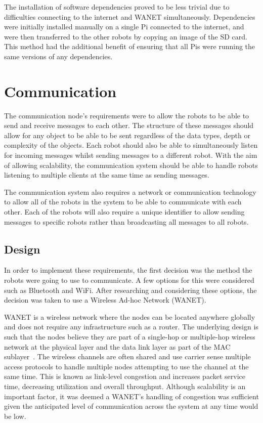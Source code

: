The installation of software dependencies proved to be less trivial due to
difficulties connecting to the internet and WANET simultaneously.
Dependencies were initially installed manually on a single Pi connected to
the internet, and were then transferred to the other robots by copying an
image of the SD card. This method had the additional benefit of ensuring
that all Pis were running the same versions of any dependencies.

\section{Communication}\label{soft/comms}
The communication node's requirements were to allow the robots to
be able to send and receive messages to each other. The structure
of these messages should allow for any object to be able to be sent
regardless of the data types, depth or complexity of the objects.
Each robot should also be able to simultaneously listen for
incoming messages whilst sending messages to a different robot.
With the aim of allowing scalability, the communication system
should be able to handle robots listening to multiple clients at the
same time as sending messages.

The communication system also requires a network or communication
technology to allow all of the robots in the system to be able to
communicate with each other. Each of the robots will also require
a unique identifier to allow sending messages to specific robots
rather than broadcasting all messages to all robots.

\subsection{Design}\label{soft/comms/design}
In order to implement these requirements,	 the first decision was the
method the robots were going to use to communicate. A few options
for this were considered such as Bluetooth and WiFi. After
researching and considering these options, the decision was taken
to use a Wireless Ad-hoc Network (WANET).

WANET is a wireless network where the nodes can be located anywhere
globally and does not require any infrastructure such as a router. The underlying design is such that the nodes believe
they are part of a single-hop or multiple-hop wireless network at the
physical layer and the data link layer as part of the MAC sublayer~\cite{rajesh2015congestion}. The wireless channels are often shared
and use carrier sense multiple access protocols to handle multiple
nodes attempting to use the channel at the same time. This is known
as link-level congestion and increases packet service time,
decreasing utilization and overall throughput. Although scalability
is an important factor, it was deemed a WANET's handling of
congestion was sufficient given the anticipated level of
communication across the system at any time would be low.

